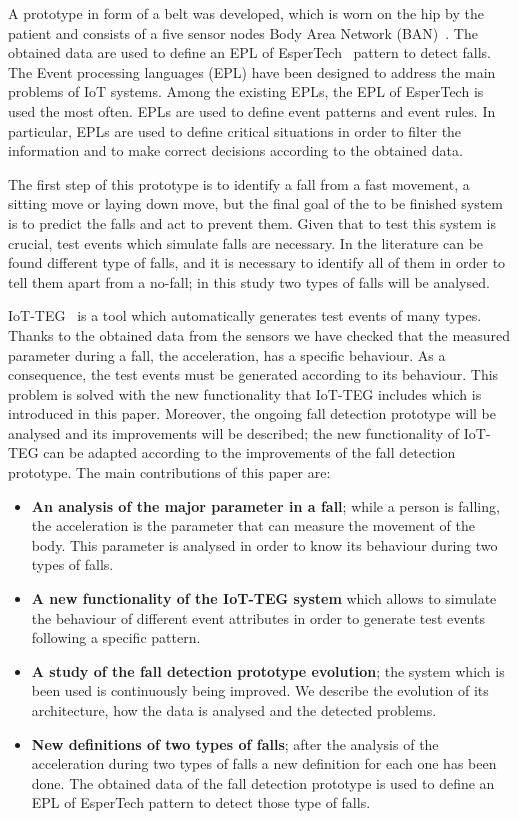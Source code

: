 \documentclass[conference]{IEEEtran}
\theoremstyle{definition}
\begin{document}
A prototype in form of a belt was developed, which is worn on the hip by the patient and consists 
of a five sensor nodes Body Area Network (BAN)~\cite{LaBlunda.2016,LaBlunda.2016b}. The obtained 
data are used to define an EPL of EsperTech~\cite{Esper:2016} pattern to detect falls. The Event 
processing languages (EPL) have been designed to address the main problems of IoT systems. Among 
the existing EPLs, the EPL of EsperTech is used the most often. EPLs are used to define event patterns 
and event rules. In particular, EPLs are used to define critical situations
in order to filter the information and to make correct decisions according to the obtained data.

The first step of this prototype is to identify a fall from a fast movement, a sitting move or laying 
down move, but the final goal of the to be finished system is to predict the falls and act to prevent 
them. Given that to test this system is crucial, test events which simulate falls are necessary. In 
the literature can be found different type of falls, and it is necessary to identify all of them in 
order to tell them apart from a no-fall; in this study two types of falls will be analysed. 

IoT-TEG~\cite{TesisGutierrez2017,Gutierrez2017} is a tool which automatically generates test events 
of many types. Thanks to the obtained data from the sensors we have checked that the measured 
parameter during a fall, the acceleration, has a specific behaviour. As a consequence, the test events 
must be generated according to its behaviour. This problem is solved with the new functionality that 
IoT-TEG includes which is introduced in this paper. Moreover, the ongoing fall detection prototype will 
be analysed and its improvements will be described; the new functionality of IoT-TEG can be adapted 
according to the improvements of the fall detection prototype. The main contributions of this paper are:

\begin{itemize}
 \item \textbf{An analysis of the major parameter in a fall}; while a person is falling, the acceleration 
 is the parameter that can measure the movement of the body. This parameter is analysed in order to know 
 its behaviour during two types of falls.
 \item \textbf{A new functionality of the IoT-TEG system} which allows to simulate the behaviour of 
 different event attributes in order to generate test events following a specific pattern.
 \item \textbf{A study of the fall detection prototype evolution}; the system which is been used is
 continuously being improved. We describe the evolution of its architecture, how the data is analysed and 
 the detected problems.
 \item \textbf{New definitions of two types of falls}; after the analysis of the acceleration during two 
 types of falls a new definition for each one has been done. The obtained data of the fall detection 
 prototype is used to define an EPL of EsperTech pattern to detect those type of falls. 
\end{itemize}
\end{document}

